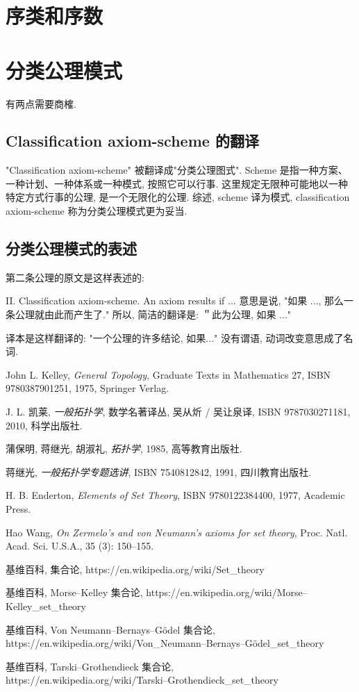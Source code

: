 \documentclass[zihao=-4,a4paper]{ctexart}
\begin{document}
\section{序类和序数 }
	
\section{分类公理模式 }	
有两点需要商榷.
\subsection{Classification axiom-scheme 的翻译}
"Classification axiom-scheme" 被翻译成"分类公理图式". Scheme  是指一种方案、一种计划、一种体系或一种模式, 按照它可以行事. 这里规定无限种可能地以一种特定方式行事的公理, 是一个无限化的公理. 
综述, scheme 译为模式, classification axiom-scheme 称为分类公理模式更为妥当.

\subsection{分类公理模式的表述}
第二条公理的原文是这样表述的:

II. Classification axiom-scheme. An axiom results if ... 意思是说, "如果 ...,
那么一条公理就由此而产生了." 所以, 简洁的翻译是: ＂此为公理, 如果 ..."
	
译本是这样翻译的: "一个公理的许多结论, 如果..." 没有谓语, 动词改变意思成了名词.


\begin{thebibliography}{9}
John L. Kelley,  \emph{General Topology}, Graduate Texts in Mathematics 27, ISBN 9780387901251, 1975, Springer Verlag.
	
J. L. 凯莱,  \emph{一般拓扑学}, 数学名著译丛, 吴从炘 / 吴让泉译, ISBN 9787030271181, 2010, 科学出版社.

蒲保明, 蒋继光, 胡淑礼, \emph{拓扑学}, 1985, 高等教育出版社.

蒋继光, \emph{一般拓扑学专题选讲}, ISBN 7540812842, 1991, 四川教育出版社.
	
H. B. Enderton, \emph{Elements of Set Theory}, ISBN 9780122384400, 1977, Academic Press.
	
Hao Wang, \emph{On Zermelo's and von Neumann's axioms for set theory}, Proc. Natl. Acad. Sci. U.S.A., 35 (3): 150–155.

基维百科, 集合论,	https://en.wikipedia.org/wiki/Set\_theory

基维百科, Morse–Kelley 集合论,	https://en.wikipedia.org/wiki/Morse–Kelley\_set\_theory

基维百科, Von Neumann–Bernays–Gödel  集合论,\\ https://en.wikipedia.org/wiki/Von\_Neumann–Bernays–Gödel\_set\_theory

基维百科, Tarski–Grothendieck  集合论,\\
https://en.wikipedia.org/wiki/Tarski–Grothendieck\_set\_theory

\end{thebibliography}
\end{document}
